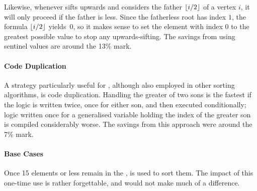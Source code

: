 Likewise, whenever \HS{} sifts upwards and considers the father \(\lfloor i / 2\rfloor\) of a vertex \(i\), it will only proceed if the father is less.
Since the fatherless root has index \(1\), the formula \(\lfloor i / 2\rfloor\) yields~\(0\), so it makes sense to set the element with index \(0\) to the greatest possible value to stop any upwards-sifting.
The savings from using sentinel values are around the 13\% mark.


\paragraph{Code Duplication}
A strategy particularly useful for \HS{}, although also employed in other sorting algorithms, is code duplication.
Handling the greater of two sons is the fastest if the logic is written twice, once for either son, and then executed conditionally;
logic written once for a generalised variable holding the index of the greater son is compiled considerably worse.
The savings from this approach were around the 7\% mark.


\paragraph{Base Cases}
Once 15 elements or less remain in the \HS{}, \IS{} is used to sort them.
The impact of this one-time use is rather forgettable, and \ShS{} would not make much of a difference.




